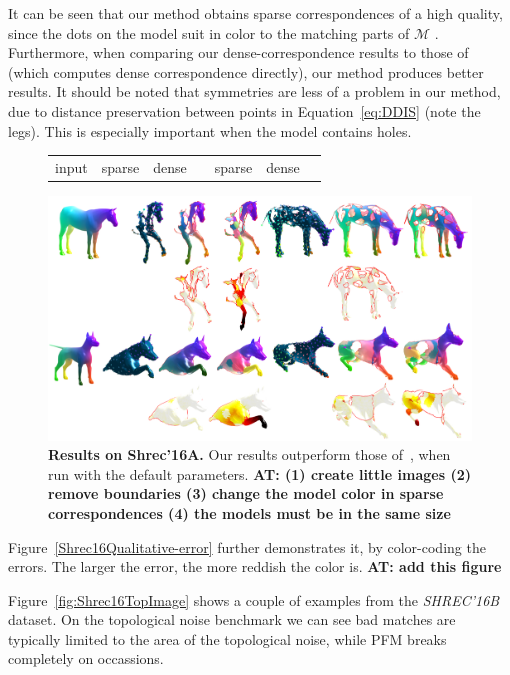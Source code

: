 \documentclass[10pt,twocolumn,letterpaper]{article}
\newcommand{\colornote}[3]{{\color{#1}\bf{#2: #3}\normalfont}}
\newcommand{\colornote}[3]{}
\newcommand {\ayellet}[1]{\colornote{blue}{AT}{#1}}
\begin{document}
It can be seen that our method obtains sparse correspondences of a high quality, since the dots on the model suit in color to the matching parts of $\mathcal{M}$ .
Furthermore, when comparing our dense-correspondence results to those of~\cite{rodola2017partial} (which computes dense correspondence directly), our method produces better results.
It should be noted that symmetries are less of a problem in our method, due to distance preservation between points in Equation~\eqref{eq:DDIS} (note the legs).
This is especially important when the model contains holes.
\begin{figure}[htb]
	\label{Shrec16Qualitative}
	\centering
	\begin{tabular}{c|ccc|ccc}
	     input & sparse & dense &  \cite{rodola2017partial}
	           & sparse & dense & \cite{rodola2017partial}\\
	\end{tabular}
	\includegraphics[width=1\textwidth]{figures/SHREC16Partial.png}
	\caption{{\bf Results on Shrec'16A.} 
	Our results outperform those of~\cite{rodola2017partial}, when run with the default parameters.
	\ayellet{(1) create little images (2) remove boundaries (3) change the model color in sparse correspondences (4) the models must be in the same size}
	}
\end{figure}

Figure~\ref{Shrec16Qualitative-error} further demonstrates it, by color-coding the errors.
The larger the error, the more reddish the color is.
\ayellet{add this figure}

Figure~\ref{fig:Shrec16TopImage} shows a couple of examples from the {\em SHREC'16B} dataset.
On the topological noise benchmark we can see bad matches are typically limited to the area of the topological noise, while PFM breaks completely on occassions.
\end{document}

